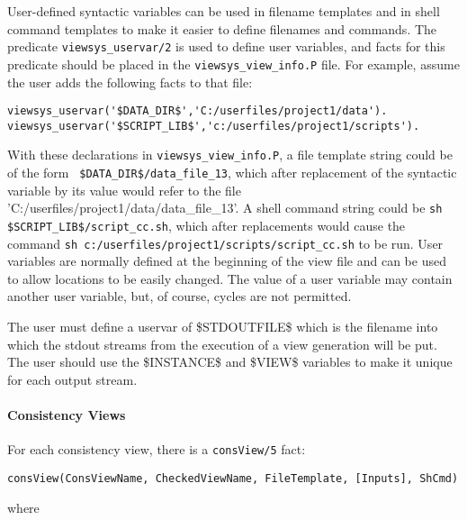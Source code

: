 User-defined syntactic variables can be used in filename templates and
in shell command templates to make it easier to define filenames and
commands.  The predicate {\tt viewsys\_uservar/2} is used to define
user variables, and facts for this predicate should be placed in the
{\tt viewsys\_view\_info.P} file.  For example, assume the user adds
the following facts to that file:

\begin{verbatim}
viewsys_uservar('$DATA_DIR$','C:/userfiles/project1/data').
viewsys_uservar('$SCRIPT_LIB$','c:/userfiles/project1/scripts').
\end{verbatim}

With these declarations in {\tt viewsys\_view\_info.P}, a file
template string could be of the form {\tt
  \$DATA\_DIR\$/data\_file\_13}, which after replacement of the
syntactic variable by its value would refer to the file
'C:/userfiles/project1/data/data\_file\_13'.  A shell command string
could be {\tt sh \$SCRIPT\_LIB\$/script\_cc.sh}, which after
replacements would cause the command {\tt sh
  c:/userfiles/project1/scripts/script\_cc.sh} to be run.  User
variables are normally defined at the beginning of the view file and
can be used to allow locations to be easily changed.  The value of a
user variable may contain another user variable, but, of course,
cycles are not permitted.

The user must define a uservar of \$STDOUTFILE\$ which is the filename
into which the stdout streams from the execution of a view generation
will be put.  The user should use the \$INSTANCE\$ and \$VIEW\$ variables
to make it unique for each output stream.

\paragraph{Consistency Views}

For each consistency view, there is a {\tt consView/5} fact:

\noindent 
{\tt consView(ConsViewName, CheckedViewName, FileTemplate, [Inputs], ShCmd)}

\noindent 
where

